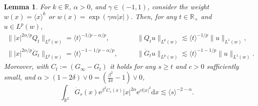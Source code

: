 \documentclass[11pt, a4paper]{scrartcl}
\numberwithin{equation}{section}
\theoremstyle{plain}
\newtheorem{lemma}[foo]{Lemma}
\theoremstyle{remark}
\newcommand{\assign}{:=}
\newcommand{\mathd}{\mathrm{d}}
\newcommand{\mathe}{\mathrm{e}}
\begin{document}
\begin{lemma}
	\label{lem:hk-exp} \label{lem:hk-scaling}For $k \in \mathbb{R}$, $\alpha >
		0$, and $\gamma \in (- 1, 1)$, consider the weight $w (x) = \langle x \rangle^k$ or $w (x) =
		\exp (\gamma m | x |)$. Then, for any $t \in \mathbb{R}_+$ and $u \in L^p
		(w)$,
	\begin{equation}
		\begin{aligned}
			\| | x |^{2 \alpha / p} Q_t \|_{L^p (w)} = \langle t \rangle^{- 1 / p -
			\alpha / p}, \quad           & \quad \| Q_t u \|_{L^p (w)} \lesssim \langle t \rangle^{- 1
			/ p} \| u \|_{L^1 (w)},                                                                    \\
			\| | x |^{2 \alpha / p}  \dot{G}_t \|_{L^p (w)} = \langle t \rangle^{- 1
			- 1 / p - \alpha / p}, \quad & \quad \| \dot{G}_t u \|_{L^p (w)} \lesssim \langle
			t \rangle^{- 1 - 1 / p} \| u \|_{L^1 (w)}.
		\end{aligned}\label{eq:QLp}
	\end{equation}
	Moreover, with $C_t \assign (G_{\infty} - G_t)$ it holds for any $s
		\geqslant t$ and $c > 0$ sufficiently small, and $\alpha > (1 - 2 \delta)
		\vee 0 = \left( \frac{\beta^2}{4 \pi} - 1 \right) \vee 0$,
	\begin{equation}
		\int_{\mathbb{R}^2} \dot{G}_s (x) \mathe^{\beta^2 C_s (x)} | x |^{2
				\alpha} \mathe^{c t | x |^2} \mathd x \lesssim \langle s \rangle^{- 2 -
			\alpha} . \label{eq:hk-scaling}
	\end{equation}
\end{lemma}
\end{document}
